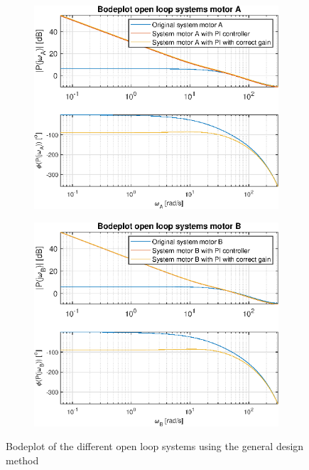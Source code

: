 \documentclass[a4paper,kul]{kulakarticle} %
\begin{document}
\begin{figure}[htp!]
	\centering
	\begin{subfigure}[b]{0.49\textwidth}
		\centering
		\includegraphics[width=\linewidth]{bodeplotA_openloop_method1.eps}
		
	\end{subfigure}
	\hfill
	\begin{subfigure}[b]{0.49\textwidth}  
		\centering
		\includegraphics[width=\linewidth]{bodeplotB_openloop_method1.eps}
		
	\end{subfigure}
	\caption{Bodeplot of the different open loop systems using the general design method}
	\label{fig:bodeplotopenloopmethod1}
\end{figure}
\end{document}

